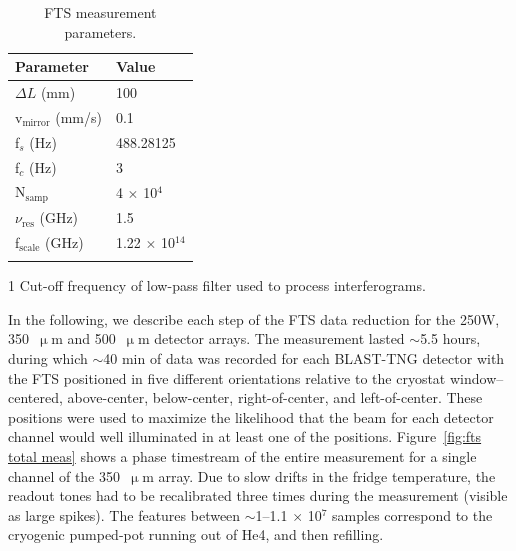 \begin{table}[!htbp]
\caption[~FTS measurement parameters.]{FTS measurement parameters.}
  \centering
\begin{threeparttable}
\begin{tabular}{@{}ll@{}}
\dtoprule
Parameter & Value \\ \midrule
$\Delta L$ (mm) & 100 \\
v$_{\mathrm{mirror}}$ (mm/s) & 0.1 \\
f$_{s}$ (Hz) & 488.28125 \\
f$_{c}$\tnote{1} (Hz) & 3 \\
N$_{\mathrm{samp}}$ & 4 $\times$ 10$^{4}$ \\
$\nu_{\mathrm{res}}$ (GHz) & 1.5 \\
f$_{\mathrm{scale}}$ (GHz) & 1.22 $\times$ 10$^{14}$ \\ \dbottomrule
\end{tabular}
\begin{tablenotes}
\item [1] Cut-off frequency of low-pass filter used to process interferograms.
\vspace{2mm}
\end{tablenotes}
\label{table:fts params}
\end{threeparttable}
\end{table}

In the following, we describe each step of the FTS data reduction for the 250W, 350~$\upmu$m and 500~$\upmu$m detector arrays. The measurement lasted $\sim$5.5 hours, during which $\sim$40 min of data was recorded for each BLAST-TNG detector with the FTS positioned in five different orientations relative to the cryostat window-- centered, above-center, below-center, right-of-center, and left-of-center. These positions were used to maximize the likelihood that the beam for each detector channel would well illuminated in at least one of the positions. Figure~\ref{fig:fts total meas} shows a phase timestream of the entire measurement for a single channel of the 350~$\upmu$m array. Due to slow drifts in the fridge temperature, the readout tones had to be recalibrated three times during the measurement (visible as large spikes). The features between $\sim$1--1.1 $\times$ 10$^{7}$ samples correspond to the cryogenic pumped-pot running out of He4, and then refilling.

